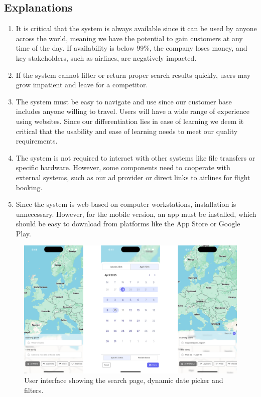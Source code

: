 \subsection*{Explanations}
\begin{enumerate}
    \item It is critical that the system is always available since it can be used by anyone across the world, meaning we have the potential to gain customers at any time of the day. If availability is below 99\%, the company loses money, and key stakeholders, such as airlines, are negatively impacted.
    \item If the system cannot filter or return proper search results quickly, users may grow impatient and leave for a competitor.
    \item The system must be easy to navigate and use since our customer base includes anyone willing to travel. Users will have a wide range of experience using websites. Since our differentiation lies in ease of learning we deem it critical that the usability and ease of learning needs to meet our quality requirements.
    \item The system is not required to interact with other systems like file transfers or specific hardware. However, some components need to cooperate with external systems, such as our ad provider or direct links to airlines for flight booking.
    \item Since the system is web-based on computer workstations, installation is unnecessary. However, for the mobile version, an app must be installed, which should be easy to download from platforms like the App Store or Google Play.
\end{enumerate}

\newpage
\begin{figure}[h]
    \includegraphics[width=.89\textwidth]{resources/mockup1.png}
    \caption{User interface showing the search page, dynamic date picker and filters.}
    \label{fig:mockup1}
\end{figure}

